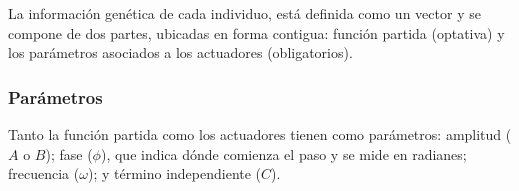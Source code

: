\documentclass{article}
\begin{document}
La informaci\'on gen\'etica de cada individuo, est\'a definida como un vector y se compone de dos partes, ubicadas en forma contigua: funci\'on partida (optativa) y los par\'ametros asociados a los actuadores (obligatorios). 

\subsubsection{Par\'ametros}
\label{sub:parametros}
Tanto la funci\'on partida como los actuadores tienen como par\'ametros: amplitud ($A$ o $B$); fase ($\phi$), que indica d\'onde comienza el paso y se mide en radianes; frecuencia ($\omega$); y t\'ermino independiente ($C$).\\
\end{document}
